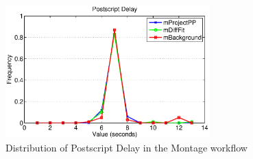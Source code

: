 \begin{figure}[h!]
	\centering
\includegraphics[width=0.7\textwidth]{figures/model/postscript_delay.eps}
    \caption{Distribution of Postscript Delay in the Montage workflow}
    \label{fig:model_montage_postscript_delay}
\end{figure}






